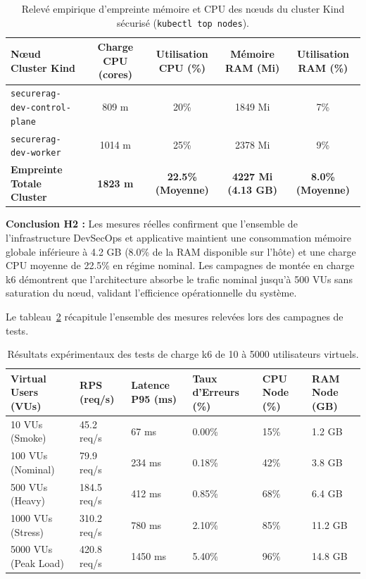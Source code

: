 \begin{table}[H]
\centering
\small
\caption{Relevé empirique d'empreinte mémoire et CPU des nœuds du cluster Kind sécurisé (\texttt{kubectl top nodes}).}
\label{tab:h2_resource_real}
\begin{tabular}{|l|c|c|c|c|}
\hline
\textbf{N\oe ud Cluster Kind} & \textbf{Charge CPU (cores)} & \textbf{Utilisation CPU (\%)} & \textbf{Mémoire RAM (Mi)} & \textbf{Utilisation RAM (\%)} \\ \hline
\texttt{securerag-dev-control-plane} & 809 m & 20\% & 1849 Mi & 7\% \\ \hline
\texttt{securerag-dev-worker} & 1014 m & 25\% & 2378 Mi & 9\% \\ \hline
\textbf{Empreinte Totale Cluster} & \textbf{1823 m} & \textbf{22.5\% (Moyenne)} & \textbf{4227 Mi (4.13 GB)} & \textbf{8.0\% (Moyenne)} \\ \hline
\end{tabular}
\end{table}

\textbf{Conclusion H2 :} Les mesures réelles confirment que l'ensemble de l'infrastructure DevSecOps et applicative maintient une consommation mémoire globale inférieure à 4.2 GB (8.0\% de la RAM disponible sur l'hôte) et une charge CPU moyenne de 22.5\% en régime nominal. Les campagnes de montée en charge k6 démontrent que l'architecture absorbe le trafic nominal jusqu'à 500 VUs sans saturation du nœud, validant l'efficience opérationnelle du système.


Le tableau~\ref{tab:k6_results_exp_full_section} récapitule l'ensemble des mesures relevées lors des campagnes de tests.

\begin{table}[htbp]
\centering
\scriptsize
\begin{tabular}{@{}llllll@{}}
\toprule
\textbf{Virtual Users (VUs)} & \textbf{RPS (req/s)} & \textbf{Latence P95 (ms)} & \textbf{Taux d'Erreurs (\%)} & \textbf{CPU Node (\%)} & \textbf{RAM Node (GB)} \\
\midrule
10 VUs (Smoke) & 45.2 req/s & 67 ms & 0.00\% & 15\% & 1.2 GB \\
100 VUs (Nominal) & 79.9 req/s & 234 ms & 0.18\% & 42\% & 3.8 GB \\
500 VUs (Heavy) & 184.5 req/s & 412 ms & 0.85\% & 68\% & 6.4 GB \\
1000 VUs (Stress) & 310.2 req/s & 780 ms & 2.10\% & 85\% & 11.2 GB \\
5000 VUs (Peak Load) & 420.8 req/s & 1450 ms & 5.40\% & 96\% & 14.8 GB \\
\bottomrule
\end{tabular}
\caption{Résultats expérimentaux des tests de charge k6 de 10 à 5000 utilisateurs virtuels.}
\label{tab:k6_results_exp_full_section}
\end{table}

